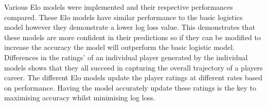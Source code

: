 \documentclass[12pt,a4paper]{article}
\begin{document}
Various Elo models were implemented and their respective performances compared. These Elo
models have similar performance to the basic logistics model however they demonstrate a
lower log loss value. This demonstrates that these models are more confident in their
predictions so if they can be modified to increase the accuracy the model will outperform
the basic logistic model. Differences in the ratings' of an individual player
generated by the individual models shows that they all succeed in capturing the overall
trajectory of a players career. The different Elo models update the player ratings at
different rates based on performance. Having the model accurately update these ratings
is the key to maximising accuracy whilst minimising log loss.

\clearpage




\vspace{10mm}
\noindent \hrulefill
\end{document}
